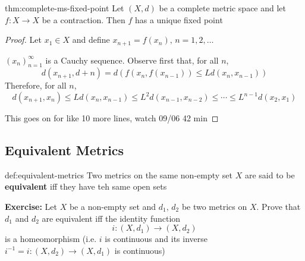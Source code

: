 \documentclass{article}
\begin{document}
\begin{thm}{thm:complete-ms-fixed-point}{}
    Let $(X, d)$ be a complete metric space and let $f : X \to X$ be a contraction. Then $f$ has a unique fixed point
\end{thm}

\begin{proof}
    Let $x_{1}\in X$ and define $x_{n+1} = f(x_{n}),\, n = 1,2,\dots$

    $(x_{n})^{\infty}_{n = 1}$ is a Cauchy sequence. Observe first that, for all $n$,
    \[d(x_{n+1}, d+n) = d(f(x_{n}, f(x_{n-1})) \le L d(x_{n}, x_{n-1}))\]
    Therefore, for all $n$,
    \[d(x_{n+1}, x_{n}) \le Ld(x_{n}, x_{n-1})\le L^{2}d(x_{n-1},x_{n-2}) \le \cdots \le L^{n-1}d(x_{2}, x_{1})\]

    This goes on for like 10 more lines, watch 09/06 42 min
\end{proof}

\subsection{Equivalent Metrics}
\begin{dfn}{def:equivalent-metrics}{}
    Two metrics on the same non-empty set $X$ are said to be \textbf{equivalent} iff they have teh same open sets
\end{dfn}

\textbf{Exercise:} Let $X$ be a non-empty set and $d_{1},\,d_{2}$ be two metrics on $X$. Prove that $d_{1}$ and $d_{2}$ are equivalent iff the identity function
\[i : (X, d_{1}) \to (X, d_{2})\]
is a homeomorphism (i.e. $i$ is continuous and its inverse $i^{-1} = i : (X, d_{2})\to (X, d_{1})$ is continuous)

\newpage
\end{document}
